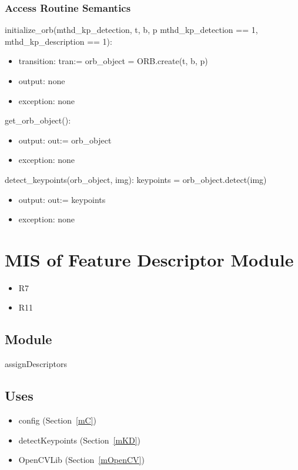 \documentclass[12pt, titlepage]{article}
\begin{document}
\subsubsection{Access Routine Semantics}

\noindent initialize\_orb(mthd\_kp\_detection, t, b, p 
\textbar \: mthd\_kp\_detection == 1, mthd\_kp\_description == 1):
\begin{itemize}
  \item transition: tran:= orb\_object = ORB.create(t, b, p) 
  \item output: none
  \item exception: none
\end{itemize}
\noindent get\_orb\_object():
\begin{itemize}
  \item output: out:= orb\_object
  \item exception: none
\end{itemize}
\noindent detect\_keypoints(orb\_object, img):\newline\newline
keypoints = orb\_object.detect(img)
\begin{itemize}
  \item output: out:= keypoints
  \item exception: none
\end{itemize}



\section{MIS of Feature Descriptor Module} \label{mFD}
\begin{itemize}
  \item R7
  \item R11
\end{itemize}
\subsection{Module}

assignDescriptors

\subsection{Uses}
\begin{itemize}
  \item config (Section~\ref{mC})
  \item detectKeypoints (Section~\ref{mKD})
  \item OpenCVLib (Section~\ref{mOpenCV})
\end{itemize}
\end{document}
